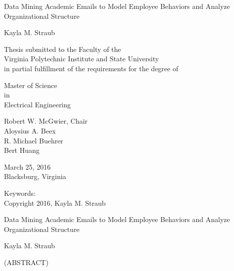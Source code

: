 \documentclass[12pt]{report}
\begin{document}
\thispagestyle{empty}
\begin{center}

{\Large 
Data Mining Academic Emails to Model Employee Behaviors and Analyze Organizational Structure
}

\vfill

Kayla M. Straub

\vfill

Thesis submitted to the Faculty of the \\
Virginia Polytechnic Institute and State University \\
in partial fulfillment of the requirements for the degree of

\vfill

Master of Science \\
in \\
Electrical Engineering
\vfill

Robert W. McGwier, Chair \\
Aloysius A. Beex\\
R. Michael Buehrer\\
Bert Huang

\vfill

March 25, 2016 \\
Blacksburg, Virginia

\vfill

Keywords: 
\\
Copyright 2016, Kayla M. Straub

\end{center}

\pagebreak

\thispagestyle{empty}
\begin{center}

{\large Data Mining Academic Emails to Model Employee Behaviors and Analyze Organizational Structure}

\vfill

Kayla M. Straub

\vfill

(ABSTRACT)

\vfill

\end{center}
\end{document}
